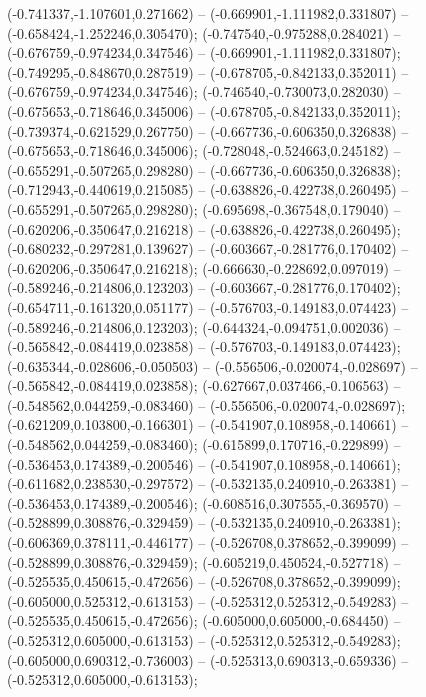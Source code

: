  (-0.741337,-1.107601,0.271662) -- (-0.669901,-1.111982,0.331807) -- (-0.658424,-1.252246,0.305470);
 (-0.747540,-0.975288,0.284021) -- (-0.676759,-0.974234,0.347546) -- (-0.669901,-1.111982,0.331807);
 (-0.749295,-0.848670,0.287519) -- (-0.678705,-0.842133,0.352011) -- (-0.676759,-0.974234,0.347546);
 (-0.746540,-0.730073,0.282030) -- (-0.675653,-0.718646,0.345006) -- (-0.678705,-0.842133,0.352011);
 (-0.739374,-0.621529,0.267750) -- (-0.667736,-0.606350,0.326838) -- (-0.675653,-0.718646,0.345006);
 (-0.728048,-0.524663,0.245182) -- (-0.655291,-0.507265,0.298280) -- (-0.667736,-0.606350,0.326838);
 (-0.712943,-0.440619,0.215085) -- (-0.638826,-0.422738,0.260495) -- (-0.655291,-0.507265,0.298280);
 (-0.695698,-0.367548,0.179040) -- (-0.620206,-0.350647,0.216218) -- (-0.638826,-0.422738,0.260495);
 (-0.680232,-0.297281,0.139627) -- (-0.603667,-0.281776,0.170402) -- (-0.620206,-0.350647,0.216218);
 (-0.666630,-0.228692,0.097019) -- (-0.589246,-0.214806,0.123203) -- (-0.603667,-0.281776,0.170402);
 (-0.654711,-0.161320,0.051177) -- (-0.576703,-0.149183,0.074423) -- (-0.589246,-0.214806,0.123203);
 (-0.644324,-0.094751,0.002036) -- (-0.565842,-0.084419,0.023858) -- (-0.576703,-0.149183,0.074423);
 (-0.635344,-0.028606,-0.050503) -- (-0.556506,-0.020074,-0.028697) -- (-0.565842,-0.084419,0.023858);
 (-0.627667,0.037466,-0.106563) -- (-0.548562,0.044259,-0.083460) -- (-0.556506,-0.020074,-0.028697);
 (-0.621209,0.103800,-0.166301) -- (-0.541907,0.108958,-0.140661) -- (-0.548562,0.044259,-0.083460);
 (-0.615899,0.170716,-0.229899) -- (-0.536453,0.174389,-0.200546) -- (-0.541907,0.108958,-0.140661);
 (-0.611682,0.238530,-0.297572) -- (-0.532135,0.240910,-0.263381) -- (-0.536453,0.174389,-0.200546);
 (-0.608516,0.307555,-0.369570) -- (-0.528899,0.308876,-0.329459) -- (-0.532135,0.240910,-0.263381);
 (-0.606369,0.378111,-0.446177) -- (-0.526708,0.378652,-0.399099) -- (-0.528899,0.308876,-0.329459);
 (-0.605219,0.450524,-0.527718) -- (-0.525535,0.450615,-0.472656) -- (-0.526708,0.378652,-0.399099);
 (-0.605000,0.525312,-0.613153) -- (-0.525312,0.525312,-0.549283) -- (-0.525535,0.450615,-0.472656);
 (-0.605000,0.605000,-0.684450) -- (-0.525312,0.605000,-0.613153) -- (-0.525312,0.525312,-0.549283);
 (-0.605000,0.690312,-0.736003) -- (-0.525313,0.690313,-0.659336) -- (-0.525312,0.605000,-0.613153);
